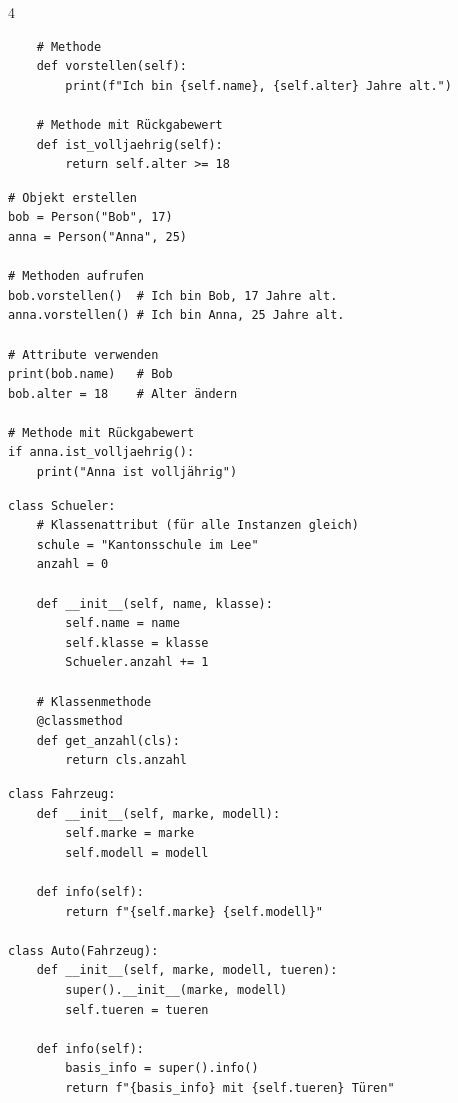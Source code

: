 \begin{landscape}
\begin{multicols*}{4}
\begin{cheatSheetBox}[title=Klassen definieren]
\begin{lstlisting}
    # Methode
    def vorstellen(self):
        print(f"Ich bin {self.name}, {self.alter} Jahre alt.")

    # Methode mit Rückgabewert
    def ist_volljaehrig(self):
        return self.alter >= 18
\end{lstlisting}
		\end{cheatSheetBox}

		\begin{cheatSheetBox}[title=Objekte erstellen und verwenden]
			\begin{lstlisting}
# Objekt erstellen
bob = Person("Bob", 17)
anna = Person("Anna", 25)

# Methoden aufrufen
bob.vorstellen()  # Ich bin Bob, 17 Jahre alt.
anna.vorstellen() # Ich bin Anna, 25 Jahre alt.

# Attribute verwenden
print(bob.name)   # Bob
bob.alter = 18    # Alter ändern

# Methode mit Rückgabewert
if anna.ist_volljaehrig():
    print("Anna ist volljährig")
\end{lstlisting}
		\end{cheatSheetBox}

		\begin{cheatSheetBox}[title=Klassenattribute]
			\begin{lstlisting}
class Schueler:
    # Klassenattribut (für alle Instanzen gleich)
    schule = "Kantonsschule im Lee"
    anzahl = 0

    def __init__(self, name, klasse):
        self.name = name
        self.klasse = klasse
        Schueler.anzahl += 1

    # Klassenmethode
    @classmethod
    def get_anzahl(cls):
        return cls.anzahl
\end{lstlisting}
		\end{cheatSheetBox}

		\begin{cheatSheetBox}[title=Vererbung]
			\begin{lstlisting}
class Fahrzeug:
    def __init__(self, marke, modell):
        self.marke = marke
        self.modell = modell

    def info(self):
        return f"{self.marke} {self.modell}"

class Auto(Fahrzeug):
    def __init__(self, marke, modell, tueren):
        super().__init__(marke, modell)
        self.tueren = tueren

    def info(self):
        basis_info = super().info()
        return f"{basis_info} mit {self.tueren} Türen"
\end{lstlisting}
		\end{cheatSheetBox}




	\end{multicols*}
\end{landscape}
\clearpage
\restoregeometry
